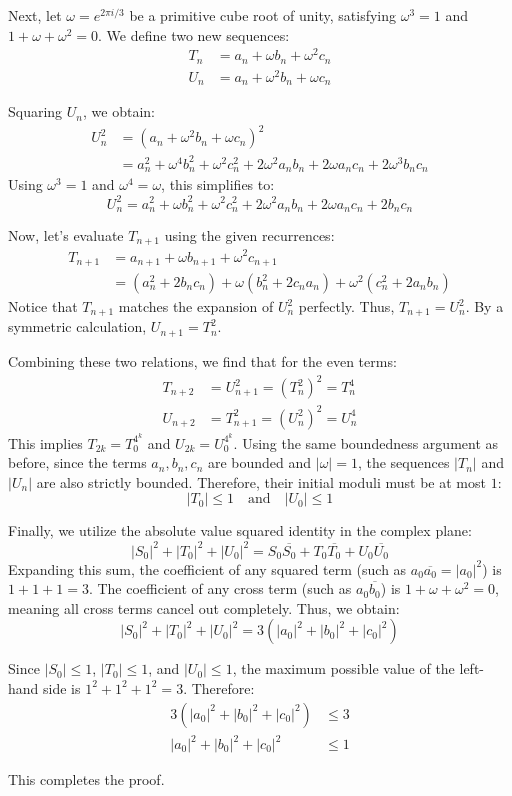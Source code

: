 \begin{enumerate}
 Next, let $\omega = e^{2\pi i / 3}$ be a primitive cube root of unity, satisfying $\omega^3 = 1$ and $1 + \omega + \omega^2 = 0$. We define two new sequences:\begin{align*}T_n &= a_n + \omega b_n + \omega^2 c_n \\U_n &= a_n + \omega^2 b_n + \omega c_n\end{align*}


 Squaring $U_n$, we obtain:\begin{align*}U_n^2 &= (a_n + \omega^2 b_n + \omega c_n)^2 \\&= a_n^2 + \omega^4 b_n^2 + \omega^2 c_n^2 + 2\omega^2 a_nb_n + 2\omega a_nc_n + 2\omega^3 b_nc_n \end{align*}
Using $\omega^3 = 1$ and $\omega^4 = \omega$, this simplifies to:
 \[U_n^2 = a_n^2 + \omega b_n^2 + \omega^2 c_n^2 + 2\omega^2 a_nb_n + 2\omega a_nc_n + 2b_nc_n\]

 Now, let's evaluate $T_{n+1}$ using the given recurrences:\begin{align*}T_{n+1} &= a_{n+1} + \omega b_{n+1} + \omega^2 c_{n+1} \\&= (a_n^2 + 2b_nc_n) + \omega(b_n^2 + 2c_na_n) + \omega^2(c_n^2 + 2a_nb_n)\end{align*}
Notice that $T_{n+1}$ matches the expansion of $U_n^2$ perfectly. Thus, $T_{n+1} = U_n^2$. By a symmetric calculation, $U_{n+1} = T_n^2$.

 Combining these two relations, we find that for the even terms:\begin{align*}T_{n+2} &= U_{n+1}^2 = (T_n^2)^2 = T_n^4 \\U_{n+2} &= T_{n+1}^2 = (U_n^2)^2 = U_n^4\end{align*}
This implies $T_{2k} = T_0^{4^k}$ and $U_{2k} = U_0^{4^k}$. Using the same boundedness argument as before, since the terms $a_n, b_n, c_n$ are bounded and $|\omega| = 1$, the sequences $|T_n|$ and $|U_n|$ are also strictly bounded. Therefore, their initial moduli must be at most $1$:
 \[|T_0| \le 1 \quad \text{and} \quad |U_0| \le 1\]

 Finally, we utilize the absolute value squared identity in the complex plane:
 \[|S_0|^2 + |T_0|^2 + |U_0|^2 = S_0\overline{S_0} + T_0\overline{T_0} + U_0\overline{U_0}\]Expanding this sum, the coefficient of any squared term (such as $a_0\overline{a_0} = |a_0|^2$) is $1 + 1 + 1 = 3$. The coefficient of any cross term (such as $a_0\overline{b_0}$) is $1 + \omega + \omega^2 = 0$, meaning all cross terms cancel out completely. Thus, we obtain:
 \[|S_0|^2 + |T_0|^2 + |U_0|^2 = 3(|a_0|^2 + |b_0|^2 + |c_0|^2)\]

 Since $|S_0| \le 1$, $|T_0| \le 1$, and $|U_0| \le 1$, the maximum possible value of the left-hand side is $1^2 + 1^2 + 1^2 = 3$. Therefore:\begin{align*}3(|a_0|^2 + |b_0|^2 + |c_0|^2) &\le 3 \\|a_0|^2 + |b_0|^2 + |c_0|^2 &\le 1\end{align*}


 This completes the proof.

 


\end{enumerate}